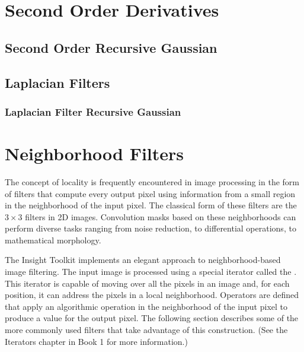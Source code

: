 \section{Second Order Derivatives}
\label{sec:SecondOrderDerivatives}


\subsection{Second Order Recursive Gaussian}
\label{sec:SecondDerivativeRecursiveGaussian}



\subsection{Laplacian Filters}
\label{sec:LaplacianFilters}

\subsubsection{Laplacian Filter Recursive Gaussian}





\section{Neighborhood Filters}
\label{sec:NeighborhoodFilters}

The concept of locality is frequently encountered in image processing in the
form of filters that compute every output pixel using information from a small
region in the neighborhood of the input pixel.  The classical form of
these filters are the $3 \times 3$ filters in 2D images. Convolution masks
based on these neighborhoods can perform diverse tasks ranging from noise
reduction, to differential operations, to mathematical morphology.

The Insight Toolkit implements an elegant approach to neighborhood-based image
filtering.  The input image is processed using a special iterator called the
. This iterator is capable of moving over all the
pixels in an image and, for each position, it can address the pixels in a local
neighborhood. Operators are defined that apply an algorithmic operation in the
neighborhood of the input pixel to produce a value for the output pixel.  The
following section describes some of the more commonly used filters that take
advantage of this construction. (See the Iterators chapter
in Book 1 for more information.)

